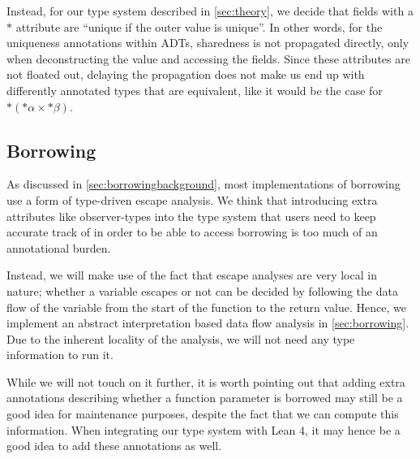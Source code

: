 Instead, for our type system described in \cref{sec:theory}, we decide that fields with a $*$ attribute are ``unique if the outer value is unique''. In other words, for the uniqueness annotations within ADTs, sharedness is not propagated directly, only when deconstructing the value and accessing the fields. Since these attributes are not floated out, delaying the propagation does not make us end up with differently annotated types that are equivalent, like it would be the case for $*(*\alpha \times *\beta)$.

\subsection{Borrowing}
As discussed in \cref{sec:borrowingbackground}, most implementations of borrowing use a form of type-driven escape analysis. We think that introducing extra attributes like observer-types into the type system that users need to keep accurate track of in order to be able to access borrowing is too much of an annotational burden.

Instead, we will make use of the fact that escape analyses are very local in nature; whether a variable escapes or not can be decided by following the data flow of the variable from the start of the function to the return value. Hence, we implement an abstract interpretation based data flow analysis in \cref{sec:borrowing}. Due to the inherent locality of the analysis, we will not need any type information to run it.

While we will not touch on it further, it is worth pointing out that adding extra annotations describing whether a function parameter is borrowed may still be a good idea for maintenance purposes, despite the fact that we can compute this information. When integrating our type system with Lean 4, it may hence be a good idea to add these annotations as well.